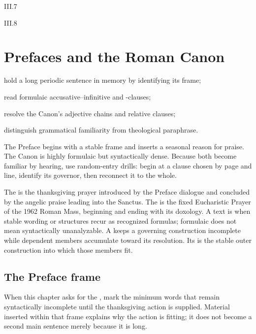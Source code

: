 \begin{courseunit}{III.7}
\end{courseunit}

\begin{courseunit}{III.8}
\chapter{Prefaces and the Roman Canon}

\begin{learningobjectives}
  \item hold a long periodic sentence in memory by identifying its frame;
  \item read formulaic accusative--infinitive and -clauses;
  \item resolve the Canon's adjective chains and relative clauses;
  \item distinguish grammatical familiarity from theological paraphrase.
\end{learningobjectives}

The Preface begins with a stable frame and inserts a seasonal reason for praise.
The Canon is highly formulaic but syntactically dense. Because both become
familiar by hearing, use random-entry drills: begin at a clause chosen by page
and line, identify its governor, then reconnect it to the whole.

The  is the thanksgiving prayer introduced by the Preface
dialogue and concluded by the angelic praise leading into the Sanctus. The
 is the fixed Eucharistic Prayer of the 1962 Roman Mass,
beginning  and ending with its doxology. A text is
 when stable wording or structures recur as recognized
formulas; formulaic does not mean syntactically unanalyzable. A
 keeps a governing construction incomplete while
dependent members accumulate toward its resolution. Its  is the
stable outer construction into which those members fit.

\section{The Preface frame}

When this chapter asks for the , mark the minimum words that remain
syntactically incomplete until the thanksgiving action is supplied. Material
inserted within that frame explains why the action is fitting; it does not
become a second main sentence merely because it is long.

\begin{quote}


\end{quote}
\end{courseunit}
